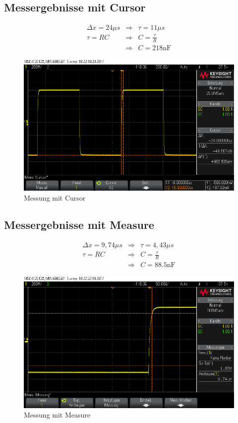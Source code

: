 \documentclass[10pt]{report}
\begin{document}
        \subsection{Messergebnisse mit Cursor}
        \begin{eqnarray*}
            \Delta x = 24 \mu s &\Rightarrow& \tau =  11 \mu s \\
            \tau = RC &\Rightarrow& C = \frac{\tau}{R}\\
            &\Rightarrow& C=218\text{nF}
        \end{eqnarray*}
        \begin{figure}[H]
         \includegraphics[width=\textwidth]{scope_2.png}
         \caption{Messung mit Cursor}
       \end{figure}

       \subsection{Messergebnisse mit Measure}
       \begin{eqnarray*}
           \Delta x = 9,74 \mu s &\Rightarrow& \tau =  4,43 \mu s \\
           \tau = RC &\Rightarrow& C = \frac{\tau}{R}\\
           &\Rightarrow& C=88.5\text{nF}
       \end{eqnarray*}
       \begin{figure}[H]
        \includegraphics[width=\textwidth]{scope_4.png}
        \caption{Messung mit Measure}
      \end{figure}
\end{document}
